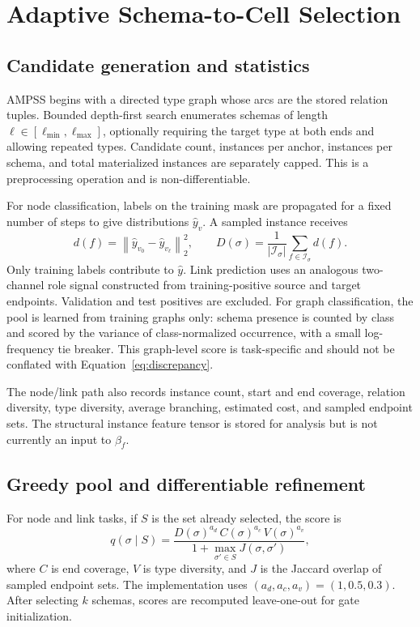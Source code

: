 \documentclass{article}
\newcommand{\ampss}{\textsc{AMPSS}}
\newcommand{\norm}[1]{\left\lVert #1\right\rVert}
\begin{document}
\section{Adaptive Schema-to-Cell Selection}
\label{sec:ampss}

\subsection{Candidate generation and statistics}

\ampss{} begins with a directed type graph whose arcs are the stored relation tuples. Bounded
depth-first search enumerates schemas of length $\ell\in[\ell_{\min},\ell_{\max}]$, optionally
requiring the target type at both ends and allowing repeated types. Candidate count, instances per
anchor, instances per schema, and total materialized instances are separately capped. This is a
preprocessing operation and is non-differentiable.

For node classification, labels on the training mask are propagated for a fixed number of steps to
give distributions $\widehat{y}_v$. A sampled instance receives
\begin{equation}
  d(f)=\norm{\widehat{y}_{v_0}-\widehat{y}_{v_\ell}}_2^2,\qquad
  D(\sigma)=\frac{1}{|\mathcal{I}_\sigma|}\sum_{f\in\mathcal{I}_\sigma}d(f).
  \label{eq:discrepancy}
\end{equation}
Only training labels contribute to $\widehat{y}$. Link prediction uses an analogous two-channel
role signal constructed from training-positive source and target endpoints. Validation and test
positives are excluded. For graph classification, the pool is learned from training graphs only:
schema presence is counted by class and scored by the variance of class-normalized occurrence,
with a small log-frequency tie breaker. This graph-level score is task-specific and should not be
conflated with Equation~\ref{eq:discrepancy}.

The node/link path also records instance count, start and end coverage, relation diversity, type
diversity, average branching, estimated cost, and sampled endpoint sets. The structural instance
feature tensor is stored for analysis but is not currently an input to $\beta_f$.

\subsection{Greedy pool and differentiable refinement}

For node and link tasks, if $S$ is the set already selected, the score is
\begin{equation}
  q(\sigma\mid S)=
  \frac{D(\sigma)^{a_d}\,C(\sigma)^{a_c}\,V(\sigma)^{a_v}}
  {1+\max_{\sigma'\in S}J(\sigma,\sigma')},
  \label{eq:topology-score}
\end{equation}
where $C$ is end coverage, $V$ is type diversity, and $J$ is the Jaccard overlap of sampled endpoint
sets. The implementation uses $(a_d,a_c,a_v)=(1,0.5,0.3)$. After selecting $k$ schemas, scores
are recomputed leave-one-out for gate initialization.
\end{document}
